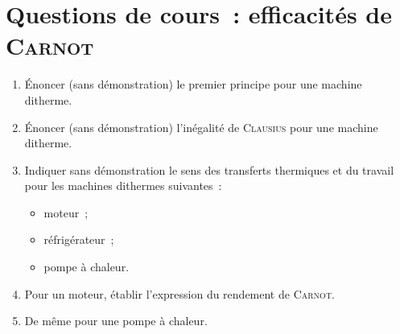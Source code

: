 \documentclass[a4paper, 10pt, final, garamond]{book}
\begin{document}
\section{Questions de cours~: efficacités de \textsc{Carnot}}
\begin{enumerate}
  \item Énoncer (sans démonstration) le premier principe pour une machine
    ditherme.
  \item Énoncer (sans démonstration) l'inégalité de \textsc{Clausius} pour une
    machine ditherme.
  \item Indiquer sans démonstration le sens des transferts thermiques et du
    travail pour les machines dithermes suivantes~:
    \begin{itemize}
      \item moteur~;
      \item réfrigérateur~;
      \item pompe à chaleur.
    \end{itemize}
  \item Pour un moteur, établir l'expression du rendement de \textsc{Carnot}.
  \item De même pour une pompe à chaleur.
\end{enumerate}
\end{document}
